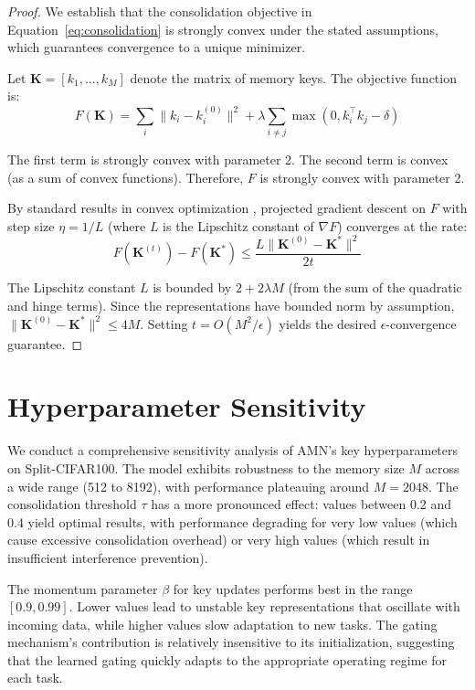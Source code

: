 \documentclass[11pt]{article}
\begin{document}
\begin{proof}
We establish that the consolidation objective in Equation~\ref{eq:consolidation} is strongly convex under the stated assumptions, which guarantees convergence to a unique minimizer.

Let $\mathbf{K} = [k_1, \ldots, k_M]$ denote the matrix of memory keys. The objective function is:
\begin{equation}
    F(\mathbf{K}) = \sum_{i} \|k_i - k_i^{(0)}\|^2 + \lambda \sum_{i \neq j} \max(0, k_i^\top k_j - \delta)
\end{equation}

The first term is strongly convex with parameter 2. The second term is convex (as a sum of convex functions). Therefore, $F$ is strongly convex with parameter 2.

By standard results in convex optimization \citep{boyd2004convex}, projected gradient descent on $F$ with step size $\eta = 1/L$ (where $L$ is the Lipschitz constant of $\nabla F$) converges at the rate:
\begin{equation}
    F(\mathbf{K}^{(t)}) - F(\mathbf{K}^*) \leq \frac{L \|\mathbf{K}^{(0)} - \mathbf{K}^*\|^2}{2t}
\end{equation}

The Lipschitz constant $L$ is bounded by $2 + 2\lambda M$ (from the sum of the quadratic and hinge terms). Since the representations have bounded norm by assumption, $\|\mathbf{K}^{(0)} - \mathbf{K}^*\|^2 \leq 4M$. Setting $t = O(M^2/\epsilon)$ yields the desired $\epsilon$-convergence guarantee.
\end{proof}

\section{Hyperparameter Sensitivity}
\label{app:hyperparams}

We conduct a comprehensive sensitivity analysis of AMN's key hyperparameters on Split-CIFAR100. The model exhibits robustness to the memory size $M$ across a wide range (512 to 8192), with performance plateauing around $M = 2048$. The consolidation threshold $\tau$ has a more pronounced effect: values between 0.2 and 0.4 yield optimal results, with performance degrading for very low values (which cause excessive consolidation overhead) or very high values (which result in insufficient interference prevention).

The momentum parameter $\beta$ for key updates performs best in the range $[0.9, 0.99]$. Lower values lead to unstable key representations that oscillate with incoming data, while higher values slow adaptation to new tasks. The gating mechanism's contribution is relatively insensitive to its initialization, suggesting that the learned gating quickly adapts to the appropriate operating regime for each task.
\end{document}
